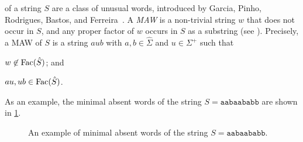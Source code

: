 of a string $S$ are a class of unusual words, introduced by Garcia, Pinho, Rodrigues, Bastos, and Ferreira~\cite{garcia2011minimal}. A \textit{MAW} is a non-trivial string $w$ that does not occur in $S$, and any proper factor of $w$ occurs in $S$ as a substring (see \cite{garcia2011minimal}).
Precisely, a MAW of $S$ is a string $a u b$ with $a, b\in \hat\Sigma$ and $u \in \Sigma^+$ such that
\begin{enumerate*}[(i)]
\item $w \not\in \mathrm{Fac}(\hat S)$; and 
\item $au, ub \in \mathrm{Fac}(\hat S)$. 
\end{enumerate*}

As an example, the minimal absent words of the string $S = \texttt{aabaababb}$ are shown in \cref{fig:example:maw}. 

\begin{figure}[t]
\centering  
\vspace{.5\baselineskip}
\caption{An example of minimal absent words of the string $S = \texttt{aabaababb}$. 
}\label{fig:example:maw}
\end{figure}

